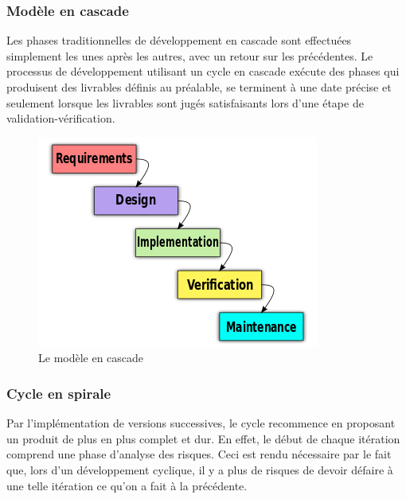 \subsubsection{Modèle en cascade}

Les phases traditionnelles de développement en cascade sont effectuées simplement les unes après les autres, avec un retour sur les précédentes. Le processus de développement utilisant un cycle en cascade exécute des phases qui produisent des livrables définis au préalable, se terminent à une date précise et seulement lorsque les livrables sont jugés satisfaisants lors d'une étape de validation-vérification.

\begin{figure}[h]
\begin{center}
    \includegraphics[scale=0.5]{img/waterfall}
    \caption{Le modèle en cascade}
	\label{waterfall}
\end{center}
\end{figure}

\subsubsection{Cycle en spirale}

Par l'implémentation de versions successives, le cycle recommence en proposant un produit de plus en plus complet et dur. En effet, le début de chaque itération comprend une phase d'analyse des risques. Ceci est rendu nécessaire par le fait que, lors d'un développement cyclique, il y a plus de risques de devoir défaire à une telle itération ce qu'on a fait à la précédente.

